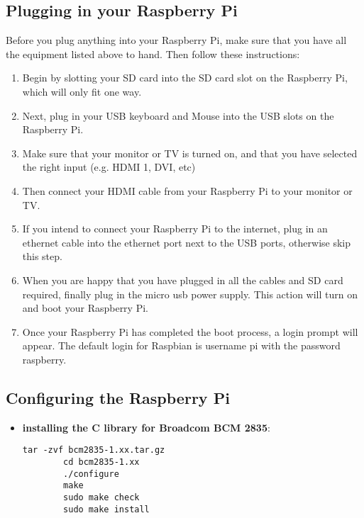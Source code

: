 \documentclass[
10pt, %
a4paper, %
oneside, %
headinclude,footinclude, %
BCOR5mm, %
]{scrartcl}
\begin{document}
\subsection{Plugging in your Raspberry Pi}
Before you plug anything into your Raspberry Pi, make sure that you have all the equipment listed above to hand. Then follow these instructions: \\
\begin{enumerate}
	\item Begin by slotting your SD card into the SD card slot on the Raspberry Pi, which will only fit one way.
	\item Next, plug in your USB keyboard and Mouse into the USB slots on the Raspberry Pi.
	\item Make sure that your monitor or TV is turned on, and that you have selected the right input (e.g. HDMI 1, DVI, etc)\\
	\item Then connect your HDMI cable from your Raspberry Pi to your monitor or TV.
	\item If you intend to connect your Raspberry Pi to the internet, plug in an ethernet cable into the ethernet port next to the USB ports, otherwise skip this step.
	\item When you are happy that you have plugged in all the cables and SD card required, finally plug in the micro usb power supply. This action will turn on and boot your Raspberry Pi.
	\item Once your Raspberry Pi has completed the boot process, a login prompt will appear. The default login for Raspbian is username pi with the password raspberry.
\end{enumerate}

\subsection{Configuring the Raspberry Pi}

\begin{itemize}
\item \textbf{installing the C library for Broadcom BCM 2835}:\\
	\begin{lstlisting}[style= BashInputStyle]
		tar -zvf bcm2835-1.xx.tar.gz 
		cd bcm2835-1.xx 
		./configure
		make
		sudo make check
		sudo make install
	\end{lstlisting}
\end{itemize} 
\end{document}
